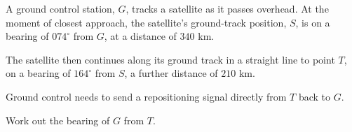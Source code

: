 \begin{question}
\noindent A ground control station, $G$, tracks a satellite as it passes overhead. At the moment of closest approach, the satellite's ground-track position, $S$, is on a bearing of $074^\circ$ from $G$, at a distance of $340$ km.

The satellite then continues along its ground track in a straight line to point $T$, on a bearing of $164^\circ$ from $S$, a further distance of $210$ km.

\begin{center}
\end{center}

Ground control needs to send a repositioning signal directly from $T$ back to $G$.

Work out the bearing of $G$ from $T$.

\vspace{5cm}
\end{question}
